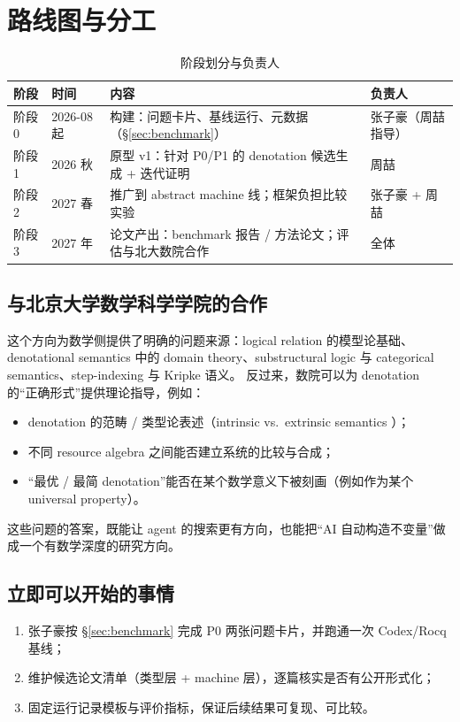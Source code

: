 \section{路线图与分工}
\label{sec:roadmap}

\begin{table}[htbp]
\centering
\caption{阶段划分与负责人}
\label{tab:roadmap}
\begin{tabular}{@{}p{}p{}p{}p{}@{}}
\toprule
\textbf{阶段} & \textbf{时间} & \textbf{内容} & \textbf{负责人} \\
\midrule
阶段 0 & 2026-08 起 & \benchmark{} 构建：问题卡片、基线运行、元数据（\S\ref{sec:benchmark}） & 张子豪（周喆指导） \\
阶段 1 & 2026 秋 & \solution{} 原型 v1：针对 P0/P1 的 denotation 候选生成 + 迭代证明 & 周喆 \\
阶段 2 & 2027 春 & 推广到 abstract machine 线；框架负担比较实验 & 张子豪 + 周喆 \\
阶段 3 & 2027 年 & 论文产出：benchmark 报告 / 方法论文；评估与北大数院合作 & 全体 \\
\bottomrule
\end{tabular}
\end{table}

\subsection{与北京大学数学科学学院的合作}
\label{sec:collab}

这个方向为数学侧提供了明确的问题来源：logical relation 的模型论基础、denotational semantics 中的
domain theory、substructural logic 与 categorical semantics、step-indexing 与 Kripke 语义。
反过来，数院可以为 denotation 的``正确形式''提供理论指导，例如：
\begin{itemize}
  \item denotation 的范畴 / 类型论表述（intrinsic vs.\ extrinsic semantics \citep{Reynolds2000Meaning}）；
  \item 不同 resource algebra 之间能否建立系统的比较与合成；
  \item ``最优 / 最简 denotation''能否在某个数学意义下被刻画（例如作为某个 universal property）。
\end{itemize}
这些问题的答案，既能让 agent 的搜索更有方向，也能把``AI 自动构造不变量''做成一个有数学深度的研究方向。

\subsection{立即可以开始的事情}

\begin{enumerate}
  \item 张子豪按 \S\ref{sec:benchmark} 完成 P0 两张问题卡片，并跑通一次 Codex/Rocq 基线；
  \item 维护候选论文清单（类型层 + machine 层），逐篇核实是否有公开形式化；
  \item 固定运行记录模板与评价指标，保证后续结果可复现、可比较。
\end{enumerate}
